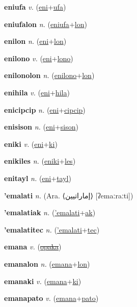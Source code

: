 \textbf{\hypertarget{eniufa}{eniufa}} \textit{v.} (\hyperlink{eni}{eni}+\allowbreak \hyperlink{ufa}{ufa})


\textbf{\hypertarget{eniufalon}{eniufalon}} \textit{n.} (\hyperlink{eniufa}{eniufa}+\allowbreak \hyperlink{lon}{lon})


\textbf{\hypertarget{enilon}{enilon}} \textit{n.} (\hyperlink{eni}{eni}+\allowbreak \hyperlink{lon}{lon})


\textbf{\hypertarget{enilono}{enilono}} \textit{v.} (\hyperlink{eni}{eni}+\allowbreak \hyperlink{lono}{lono})


\textbf{\hypertarget{enilonolon}{enilonolon}} \textit{n.} (\hyperlink{enilono}{enilono}+\allowbreak \hyperlink{lon}{lon})


\textbf{\hypertarget{enihila}{enihila}} \textit{v.} (\hyperlink{eni}{eni}+\allowbreak \hyperlink{hila}{hila})


\textbf{\hypertarget{enicipcip}{enicipcip}} \textit{n.} (\hyperlink{eni}{eni}+\allowbreak \hyperlink{cipcip}{cipcip})


\textbf{\hypertarget{enisison}{enisison}} \textit{n.} (\hyperlink{eni}{eni}+\allowbreak \hyperlink{sison}{sison})


\textbf{\hypertarget{eniki}{eniki}} \textit{v.} (\hyperlink{eni}{eni}+\allowbreak \hyperlink{ki}{ki})


\textbf{\hypertarget{enikiles}{enikiles}} \textit{n.} (\hyperlink{eniki}{eniki}+\allowbreak \hyperlink{les}{les})


\textbf{\hypertarget{enitayl}{enitayl}} \textit{n.} (\hyperlink{eni}{eni}+\allowbreak \hyperlink{tayl}{tayl})


\textbf{\hypertarget{'emalati}{'emalati}} \textit{n.} (Ara. ⟨{\arabics{}إماراتيين‎}⟩ [ʔemaːraːti])


\textbf{\hypertarget{'emalatiak}{'emalatiak}} \textit{n.} (\hyperlink{'emalati}{'emalati}+\allowbreak \hyperlink{ak}{ak})


\textbf{\hypertarget{'emalatitec}{'emalatitec}} \textit{n.} (\hyperlink{'emalati}{'emalati}+\allowbreak \hyperlink{tec}{tec})


\textbf{\hypertarget{emana}{emana}} \textit{v.} (\hyperlink{opaka}{\sout{opaka}})


\textbf{\hypertarget{emanalon}{emanalon}} \textit{n.} (\hyperlink{emana}{emana}+\allowbreak \hyperlink{lon}{lon})


\textbf{\hypertarget{emanaki}{emanaki}} \textit{v.} (\hyperlink{emana}{emana}+\allowbreak \hyperlink{ki}{ki})


\textbf{\hypertarget{emanapato}{emanapato}} \textit{v.} (\hyperlink{emana}{emana}+\allowbreak \hyperlink{pato}{pato})



